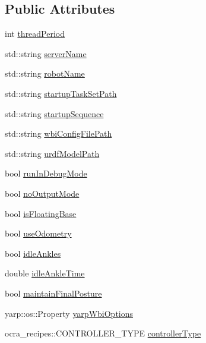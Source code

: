 \subsection*{\-Public \-Attributes}
\begin{DoxyCompactItemize}
\item 
int \hyperlink{classOcraControllerOptions_ab706ae593bf5b30433cfd6f957b51db4}{thread\-Period}
\item 
std\-::string \hyperlink{classOcraControllerOptions_a22380b083fbf0b202993d0415d1d4c83}{server\-Name}
\item 
std\-::string \hyperlink{classOcraControllerOptions_a897948011f23b08ba20e1707033458d4}{robot\-Name}
\item 
std\-::string \hyperlink{classOcraControllerOptions_af91566ecff3f7ed02571369c7af061ce}{startup\-Task\-Set\-Path}
\item 
std\-::string \hyperlink{classOcraControllerOptions_ab01efbd786ad8bc5beb6de02dbcd0936}{startup\-Sequence}
\item 
std\-::string \hyperlink{classOcraControllerOptions_af3a98210531cf667c2838e45b470a66e}{wbi\-Config\-File\-Path}
\item 
std\-::string \hyperlink{classOcraControllerOptions_a697196e6267b2a519dd0bcc2bc03ab73}{urdf\-Model\-Path}
\item 
bool \hyperlink{classOcraControllerOptions_a26dce90c0e6cf7ba608020d01cd08f3c}{run\-In\-Debug\-Mode}
\item 
bool \hyperlink{classOcraControllerOptions_af05db2783f36f469fa535fd4ba5c12b1}{no\-Output\-Mode}
\item 
bool \hyperlink{classOcraControllerOptions_a1edf322553d88c1ac2bf8947e9d942d7}{is\-Floating\-Base}
\item 
bool \hyperlink{classOcraControllerOptions_a335f09b446b6d10e2a8e6eb453391d9e}{use\-Odometry}
\item 
bool \hyperlink{classOcraControllerOptions_a34c0a162302f4f2c462d9ce4818292d5}{idle\-Ankles}
\item 
double \hyperlink{classOcraControllerOptions_af09053d38fbafe448a35804ea86d27aa}{idle\-Ankle\-Time}
\item 
bool \hyperlink{classOcraControllerOptions_ae7b16a5b8264abd18ee8761eb1091ccf}{maintain\-Final\-Posture}
\item 
yarp\-::os\-::\-Property \hyperlink{classOcraControllerOptions_ac3965bdcce6cb2ce3e4a335f855acd63}{yarp\-Wbi\-Options}
\item 
ocra\-\_\-recipes\-::\-C\-O\-N\-T\-R\-O\-L\-L\-E\-R\-\_\-\-T\-Y\-P\-E \hyperlink{classOcraControllerOptions_aa533fe11c53b7fb17105f1edf48e1c0d}{controller\-Type}

\end{DoxyCompactItemize}
